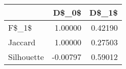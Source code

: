 \begin{table}
\centering
\caption{}
\label{}
\begin{tabular}{lrr}
\toprule
{} &    D\$\_0\$ &   D\$\_1\$ \\
\midrule
F\$\_1\$      &  1.00000 & 0.42190 \\
Jaccard    &  1.00000 & 0.27503 \\
Silhouette & -0.00797 & 0.59012 \\
\bottomrule
\end{tabular}
\end{table}
